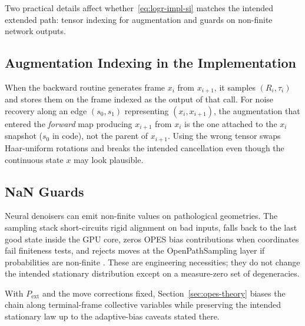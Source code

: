 Two practical details affect whether~\eqref{eq:logr-impl-si} matches the intended
extended path: tensor indexing for augmentation and guards on non-finite network
outputs.

\subsection{Augmentation Indexing in the Implementation}

When the backward routine generates frame $x_i$ from $x_{i+1}$, it samples $(R_i,\tau_i)$ and stores them on the frame indexed as the output of that call. For noise recovery along an edge $(s_0,s_1)$ representing $(x_i,x_{i+1})$, the augmentation that entered the \emph{forward} map producing $x_{i+1}$ from $x_i$ is the one attached to the $x_i$ snapshot ($s_0$ in code), not the parent of $x_{i+1}$. Using the wrong tensor swaps Haar-uniform rotations and breaks the intended cancellation even though the continuous state $x$ may look plausible.

\subsection{NaN Guards}

Neural denoisers can emit non-finite values on pathological geometries. The sampling stack short-circuits rigid alignment on bad inputs, falls back to the last good state inside the GPU core, zeros OPES bias contributions when coordinates fail finiteness tests, and rejects moves at the OpenPathSampling layer if probabilities are non-finite \citep{ops}. These are engineering necessities; they do not change the intended stationary distribution except on a measure-zero set of degeneracies.

With $P_{\mathrm{ext}}$ and the move corrections fixed, Section~\ref{sec:opes-theory}
biases the chain along terminal-frame collective variables while preserving the
intended stationary law up to the adaptive-bias caveats stated there.
